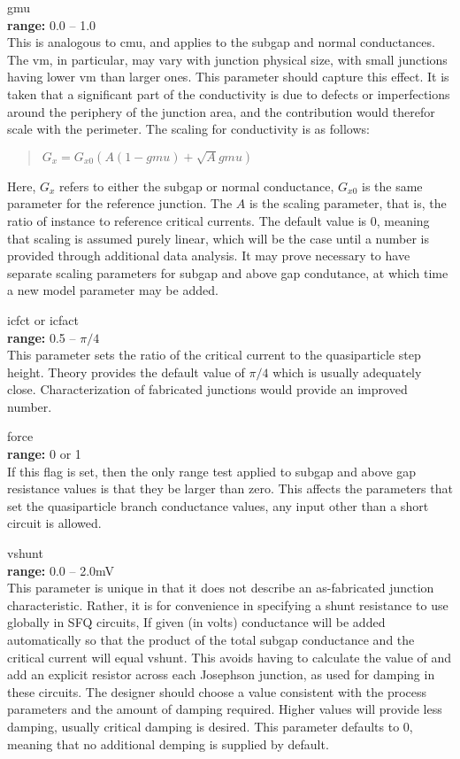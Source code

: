 \begin{description}
\item{\vt gmu}\\
{\bf range:} 0.0 -- 1.0\\
This is analogous to {\vt cmu}, and applies to the subgap and normal
conductances.  The {\vt vm}, in particular, may vary with junction
physical size, with small junctions having lower {\vt vm} than larger
ones.  This parameter should capture this effect.  It is taken that a
significant part of the conductivity is due to defects or
imperfections around the periphery of the junction area, and the
contribution would therefor scale with the perimeter.  The scaling for
conductivity is as follows:
\begin{quote}
$G_x = G_{x0} (A(1-gmu) + \sqrt{A} gmu)$
\end{quote}
Here, $G_x$ refers to either the subgap or normal conductance,
$G_{x0}$ is the same parameter for the reference junction.  The $A$ is
the scaling parameter, that is, the ratio of instance to reference
critical currents.  The default value is 0, meaning that scaling is
assumed purely linear, which will be the case until a number is
provided through additional data analysis.  It may prove necessary to
have separate scaling parameters for subgap and above gap condutance,
at which time a new model parameter may be added.

\item{{\vt icfct} or {\vt icfact}}\\
{\bf range:} 0.5 -- ${\pi}/4$\\
This parameter sets the ratio of the critical current to the
quasiparticle step height.  Theory provides the default value of
$\pi/4$ which is usually adequately close.  Characterization of
fabricated junctions would provide an improved number.

\item{\vt force}\\
{\bf range:} 0 or 1\\
If this flag is set, then the only range test applied to subgap and
above gap resistance values is that they be larger than zero.  This
affects the parameters that set the quasiparticle branch conductance
values, any input other than a short circuit is allowed.

\item{\vt vshunt}\\
{\bf range:} 0.0 -- 2.0mV\\
This parameter is unique in that it does not describe an as-fabricated
junction characteristic.  Rather, it is for convenience in specifying
a shunt resistance to use globally in SFQ circuits, If given (in
volts) conductance will be added automatically so that the product of
the total subgap conductance and the critical current will equal {\vt
vshunt}.  This avoids having to calculate the value of and add an
explicit resistor across each Josephson junction, as used for damping
in these circuits.  The designer should choose a value consistent with
the process parameters and the amount of damping required.  Higher
values will provide less damping, usually critical damping is desired. 
This parameter defaults to 0, meaning that no additional demping is
supplied by default.


\end{description}

